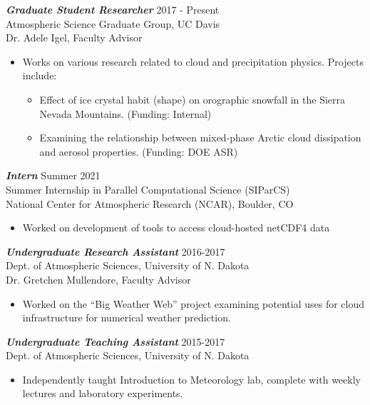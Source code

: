 \documentclass[margin]{res}
\begin{document}
\begin{resume}
                {\sl \textbf{Graduate Student Researcher}} \hfill 2017 - Present \\
                Atmospheric Science Graduate Group, UC Davis \\
                Dr. Adele Igel, Faculty Advisor \\
                \begin{itemize}
                    \item Works on various research related to cloud and precipitation physics. Projects include:
                    \begin{itemize} \itemsep -2pt
                        \item Effect of ice crystal habit (shape) on orographic snowfall in the Sierra Nevada Mountains. (Funding: Internal)
                        \item Examining the relationship between mixed-phase Arctic cloud dissipation and aerosol properties. (Funding: DOE ASR) 
                    \end{itemize}
                \end{itemize}

                {\sl \textbf{Intern}} \hfill Summer 2021 \\
                Summer Internship in Parallel Computational Science (SIParCS) \\
                National Center for Atmospheric Research (NCAR), Boulder, CO
                \begin{itemize}
                    \item Worked on development of tools to access cloud-hosted netCDF4 data 
                \end{itemize}

                {\sl \textbf{Undergraduate Research Assistant}} \hfill 2016-2017 \\
                Dept. of Atmospheric Sciences, University of N. Dakota \\
                Dr. Gretchen Mullendore, Faculty Advisor \\
                \begin{itemize}\itemsep -2pt
                    \item Worked on the “Big Weather Web” project examining potential uses for cloud infrastructure for numerical weather prediction.
                \end{itemize}

                {\sl \textbf{Undergraduate Teaching Assistant}} \hfill 2015-2017 \\
                Dept. of Atmospheric Sciences, University of N. Dakota \\
                \begin{itemize}\itemsep -2pt
                    \item Independently taught Introduction to Meteorology lab, complete with weekly lectures and laboratory experiments.
                    

\end{itemize}
\end{resume}
\end{document}
